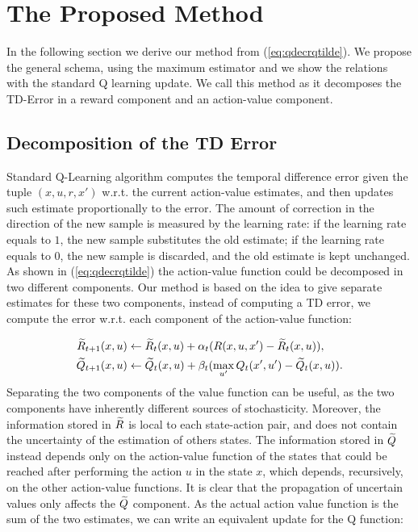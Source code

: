 \documentclass[conference]{IEEEtran}
\begin{document}
\section{The Proposed Method}

In the following section we derive our method from (\ref{eq:qdecrqtilde}). We propose the general schema, using the maximum estimator and we show the relations with the standard Q learning update. We call this method \emph{\alg} as it decomposes the TD-Error in a reward component and an action-value component.

\subsection{Decomposition of the TD Error}

Standard Q-Learning algorithm computes the temporal difference error given the tuple $(x,u,r,x')$ w.r.t. the current action-value estimates, and then updates such estimate proportionally to the error. The amount of correction in the direction of the new sample is measured by the learning rate: if the learning rate equals to $1$, the new sample substitutes the old estimate; if the learning rate equals to $0$, the new sample is discarded, and the old estimate is kept unchanged. 
As shown in (\ref{eq:qdecrqtilde}) the action-value function could be decomposed in two different components. Our method is based on the idea to give separate estimates for these two components, instead of computing a TD error, we compute the error w.r.t. each component of the action-value function:

\begin{align}
\Rtilde_{t+1}(x,u) & \leftarrow\Rtilde_t(x,u)+\alpha_t(R(x,u,x')-\Rtilde_t(x,u)), \label{eq:rtilupdedate}\\
\Qtilde_{t+1}(x,u) & \leftarrow\Qtilde_t(x,u)+\beta_t(\max_{u'}Q_t(x',u')-\Qtilde_t(x,u)).
\label{eq:qtildeupdate}
\end{align}
Separating the two components of the value function can be useful, as the two components have inherently different sources of stochasticity. Moreover, the information stored in $\widetilde{R}$ is local to each state-action pair, and does not contain the uncertainty of the estimation of others states. The information stored in $\widetilde{Q}$ instead depends only on the action-value function of the states that could be reached after performing the action $u$ in the state $x$, which depends, recursively, on the other action-value functions. It is clear that the propagation of uncertain values only affects the $\widetilde{Q}$ component.
As the actual action value function is the sum of the two estimates, we can write an equivalent update for the Q function:
\end{document}

